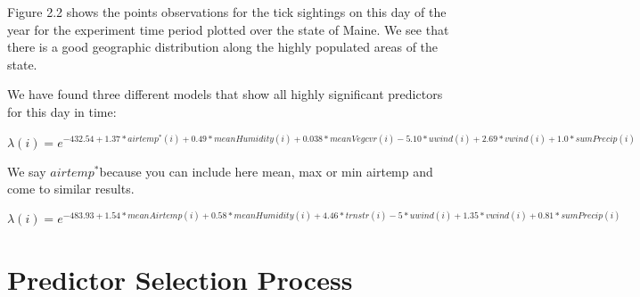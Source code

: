 \noindent Figure 2.2 shows the points observations for the tick sightings on this day of the year for the experiment time period plotted over the state of Maine. We see that there is a good geographic distribution along the highly populated areas of the state. \newline

\noindent We have found three different models that show all highly significant predictors for this day in time:

\begin{equation}
\lambda(i) = e^{-432.54 + 1.37*airtemp^*(i) + 0.49*meanHumidity(i) + 0.038*meanVegcvr(i) - 5.10*uwind(i) + 2.69*vwind(i) + 1.0*sumPrecip(i) }
\end{equation}

\noindent We say $airtemp^* $because you can include here mean, max or min airtemp and come to similar results.


\begin{equation}
\lambda(i) = e^{-483.93 + 1.54*meanAirtemp(i) + 0.58*meanHumidity(i) + 4.46*trnstr(i) - 5*uwind(i) + 1.35*vwind(i) + 0.81*sumPrecip(i) }
\end{equation}
\newline


\section{Predictor Selection Process}

